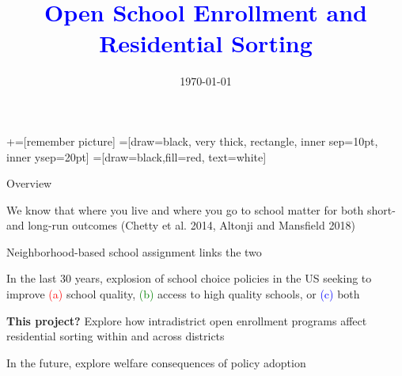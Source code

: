 \documentclass[notes,11pt, aspectratio=169]{beamer}
\title[]{\textcolor{blue}{Open School Enrollment and Residential Sorting}}
\author[MCC]{}
\institute[Yale]{\small{\begin{tabular}{c}
Crossan Cooper  \\
Yale University \\
\end{tabular}}}
\date{\today}
\newenvironment{wideitemize}{\itemize\addtolength{\itemsep}{10pt}}{\enditemize}
\begin{document}
\newcommand\marktopleft[1]{%
    \tikz[overlay,remember picture] 
        \node (marker-#1-a) at (-.3em,.3em) {};%
}
\newcommand\markbottomright[2]{%
    \tikz[overlay,remember picture] 
        \node (marker-#1-b) at (0em,0em) {};%
}
+=[remember picture] 
 =[draw=black, very thick, rectangle, inner sep=10pt, inner ysep=20pt]
 =[draw=black,fill=red, text=white]

\begin{frame}
\maketitle
\end{frame}


\begin{frame}{Overview}
\label{mapback}
  \begin{wideitemize}
    \item We know that where you live and where you go to school matter for both short- and long-run outcomes (Chetty et al. 2014, Altonji and Mansfield 2018)
    \item Neighborhood-based school assignment links the two
    \item In the last 30 years, explosion of school choice policies in the US seeking to improve \textcolor{red}{(a)} school quality, \textcolor{green}{(b)} access to high quality schools, or \textcolor{blue}{(c)} both \hyperlink{map}{}
    \item \textbf{This project?} Explore how intradistrict open enrollment programs affect residential sorting within and across districts
    \begin{wideitemize}
    \item In the future, explore welfare consequences of policy adoption
    \end{wideitemize}
  \end{wideitemize}
  
\end{frame}
\end{document}
